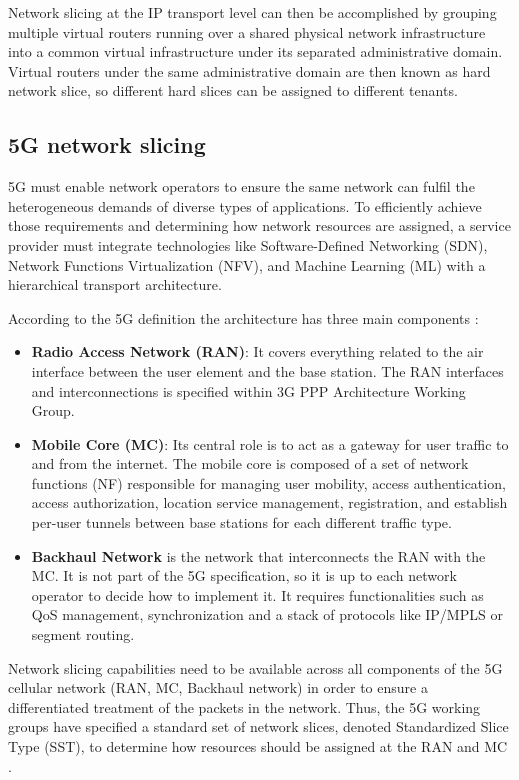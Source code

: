 \documentclass[journal,article,submit,moreauthors,pdftex]{Definitions/mdpi}
\begin{document}
Network slicing at the IP transport level can then be accomplished by grouping multiple virtual routers running over a shared physical network infrastructure into a common virtual infrastructure under its separated administrative domain. Virtual routers under the same administrative domain are then known as hard network slice, so different hard slices can be assigned to different tenants.

\subsection{5G network slicing}

5G must enable network operators to ensure the same network can fulfil the heterogeneous demands of diverse types of applications. To efficiently achieve those requirements and determining how network resources are assigned, a service provider must integrate technologies like Software-Defined Networking (SDN), Network Functions Virtualization (NFV), and Machine Learning (ML)  with a hierarchical transport architecture. 

According to the 5G definition the architecture has three main components \cite{etsi2018123,redana20195g}:

\begin{itemize}
\item  \textbf{Radio Access Network (RAN)}: It covers everything related to the air interface between the user element and the base station. The RAN interfaces and interconnections is specified within 3G PPP Architecture Working Group. 

\item  \textbf{Mobile Core (MC)}: Its central role is to act as a gateway for user traffic to and from the internet. The mobile core is composed of a set of network functions (NF) responsible for managing user mobility, access authentication, access authorization, location service management, registration, and establish per-user tunnels between base stations for each different traffic type.

\item \textbf{Backhaul Network} is the network that interconnects the RAN with the MC. It is not part of the 5G specification, so it is up to each network operator to decide how to implement it. It requires functionalities such as QoS management,  synchronization and a stack of protocols like IP/MPLS or segment routing.
\end{itemize}

Network slicing capabilities need to be available across all components of the 5G cellular network (RAN, MC, Backhaul network) in order to ensure a differentiated treatment of the packets in the network. Thus, the 5G working groups have specified a standard set of network slices, denoted Standardized Slice Type (SST), to determine how resources should be assigned at the RAN and MC \cite{ferrus2018automation}.   
\end{document}
